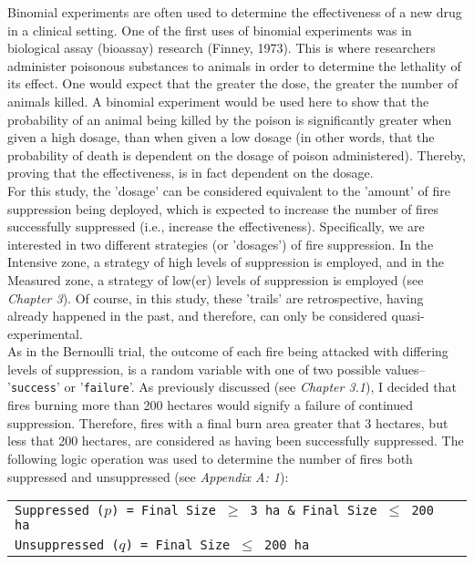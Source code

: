 \begin{spacing}{1.5}
\noindent Binomial experiments are often used to determine the effectiveness of a new drug in a clinical setting. One of the first uses of binomial experiments was in biological assay (bioassay) research (Finney, 1973). This is where researchers administer poisonous substances to animals in order to determine the lethality of its effect. One would expect that the greater the dose, the greater the number of animals killed. A binomial experiment would be used here to show that the probability of an animal being killed by the poison is significantly greater when given a high dosage, than when given a low dosage (in other words, that the probability of death is dependent on the dosage of poison administered). Thereby, proving that the effectiveness, is in fact dependent on the dosage. \\

\noindent For this study, the 'dosage' can be considered equivalent to the 'amount' of fire suppression being deployed, which is expected to increase the number of fires successfully suppressed (i.e., increase the effectiveness). Specifically, we are interested in two different strategies (or 'dosages') of fire suppression. In the Intensive zone, a strategy of high levels of suppression is employed, and in the Measured zone, a strategy of low(er) levels of suppression is employed (see \emph{Chapter 3}). Of course, in this study, these 'trails' are retrospective, having already happened in the past, and therefore, can only be considered quasi-experimental. \\

\noindent As in the Bernoulli trial, the outcome of each fire being attacked with differing levels of suppression, is a random variable with one of two possible values-- '\texttt{success}' or '\texttt{failure}'. As previously discussed (see \emph{Chapter 3.1}), I decided that fires burning more than 200 hectares would signify a failure of continued suppression. Therefore, fires with a final burn area greater that 3 hectares, but less that 200 hectares, are considered as having been successfully suppressed. The following logic operation was used to determine the number of fires both suppressed and unsuppressed (see \emph{Appendix A: 1}): \\


\begin{tabular}{ll}
\texttt{Suppressed ($p$) = Final Size $\geq$ 3 ha \& Final Size $\leq$ 200 ha} \\
\texttt{Unsuppressed ($q$) = Final Size $\leq$ 200 ha} \\
\end{tabular}\\


\end{spacing}
